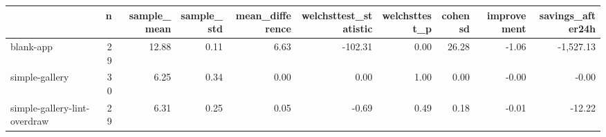 \begin{tabular}{lrrrrrrrrr}
\toprule
{} &   n &  sample\_mean &  sample\_std &  mean\_difference &  welchsttest\_statistic &  welchsttest\_p &  cohensd &  improvement &  savings\_after24h \\
\midrule
blank-app                    &  29 &        12.88 &        0.11 &             6.63 &                -102.31 &           0.00 &    26.28 &        -1.06 &         -1,527.13 \\
simple-gallery               &  30 &         6.25 &        0.34 &             0.00 &                   0.00 &           1.00 &     0.00 &        -0.00 &             -0.00 \\
simple-gallery-lint-overdraw &  29 &         6.31 &        0.25 &             0.05 &                  -0.69 &           0.49 &     0.18 &        -0.01 &            -12.22 \\
\bottomrule
\end{tabular}
